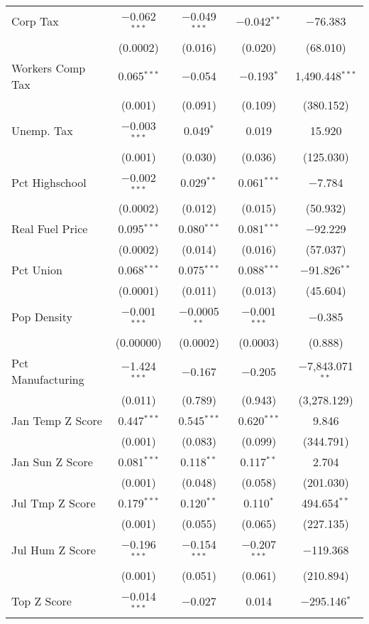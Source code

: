 \begin{table}[!htbp]
\begin{tabular}{@{\extracolsep{5pt}}lcccc}
  Corp Tax & $-$0.062$^{***}$ & $-$0.049$^{***}$ & $-$0.042$^{**}$ & $-$76.383 \\ 
  & (0.0002) & (0.016) & (0.020) & (68.010) \\ 
  Workers Comp Tax & 0.065$^{***}$ & $-$0.054 & $-$0.193$^{*}$ & 1,490.448$^{***}$ \\ 
  & (0.001) & (0.091) & (0.109) & (380.152) \\ 
  Unemp. Tax & $-$0.003$^{***}$ & 0.049$^{*}$ & 0.019 & 15.920 \\ 
  & (0.001) & (0.030) & (0.036) & (125.030) \\ 
  Pct Highschool & $-$0.002$^{***}$ & 0.029$^{**}$ & 0.061$^{***}$ & $-$7.784 \\ 
  & (0.0002) & (0.012) & (0.015) & (50.932) \\ 
  Real Fuel Price & 0.095$^{***}$ & 0.080$^{***}$ & 0.081$^{***}$ & $-$92.229 \\ 
  & (0.0002) & (0.014) & (0.016) & (57.037) \\ 
  Pct Union & 0.068$^{***}$ & 0.075$^{***}$ & 0.088$^{***}$ & $-$91.826$^{**}$ \\ 
  & (0.0001) & (0.011) & (0.013) & (45.604) \\ 
  Pop Density & $-$0.001$^{***}$ & $-$0.0005$^{**}$ & $-$0.001$^{***}$ & $-$0.385 \\ 
  & (0.00000) & (0.0002) & (0.0003) & (0.888) \\ 
  Pct Manufacturing & $-$1.424$^{***}$ & $-$0.167 & $-$0.205 & $-$7,843.071$^{**}$ \\ 
  & (0.011) & (0.789) & (0.943) & (3,278.129) \\ 
  Jan Temp Z Score & 0.447$^{***}$ & 0.545$^{***}$ & 0.620$^{***}$ & 9.846 \\ 
  & (0.001) & (0.083) & (0.099) & (344.791) \\ 
  Jan Sun Z Score & 0.081$^{***}$ & 0.118$^{**}$ & 0.117$^{**}$ & 2.704 \\ 
  & (0.001) & (0.048) & (0.058) & (201.030) \\ 
  Jul Tmp Z Score & 0.179$^{***}$ & 0.120$^{**}$ & 0.110$^{*}$ & 494.654$^{**}$ \\ 
  & (0.001) & (0.055) & (0.065) & (227.135) \\ 
  Jul Hum Z Score & $-$0.196$^{***}$ & $-$0.154$^{***}$ & $-$0.207$^{***}$ & $-$119.368 \\ 
  & (0.001) & (0.051) & (0.061) & (210.894) \\ 
  Top Z Score & $-$0.014$^{***}$ & $-$0.027 & 0.014 & $-$295.146$^{*}$ \\ 

\end{tabular}
\end{table}
